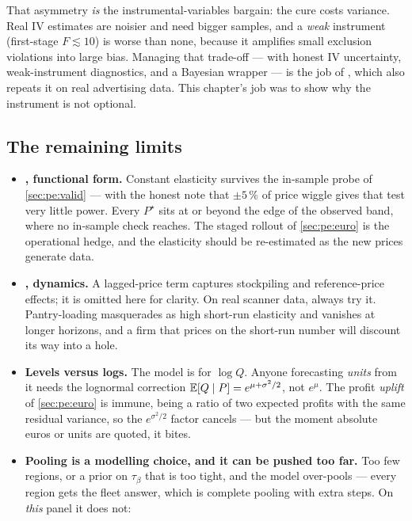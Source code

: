 That asymmetry \emph{is} the instrumental-variables bargain: the cure costs variance. Real IV
estimates are noisier and need bigger samples, and a \emph{weak} instrument (first-stage
$F \lesssim 10$) is worse than none, because it amplifies small exclusion violations into large
bias. Managing that trade-off --- with honest IV uncertainty, weak-instrument diagnostics, and a
Bayesian wrapper --- is the job of , which also repeats it on real advertising data. This
chapter's job was to show why the instrument is not optional.

\subsection*{The remaining limits}

\begin{itemize}[leftmargin=*]
  \item \textbf{, functional form.} Constant elasticity survives the in-sample
        probe of \cref{sec:pe:valid} --- with the honest note that $\pm 5\,\%$ of price wiggle gives
        that test very little power. Every $P^\star$ sits at or beyond the edge of the observed
        band, where no in-sample check reaches. The staged rollout of \cref{sec:pe:euro} is the
        operational hedge, and the elasticity should be re-estimated as the new prices generate
        data.
  \item \textbf{, dynamics.} A lagged-price term captures stockpiling and
        reference-price effects; it is omitted here for clarity. On real scanner data, always try
        it. Pantry-loading masquerades as high short-run elasticity and vanishes at longer horizons,
        and a firm that prices on the short-run number will discount its way into a hole.
  \item \textbf{Levels versus logs.} The model is for $\log Q$. Anyone forecasting \emph{units} from
        it needs the lognormal correction $\operatorname{\mathbb{E}}[Q \mid P] = e^{\mu + \sigma^{2}/2}$, not $e^{\mu}$.
        The profit \emph{uplift} of \cref{sec:pe:euro} is immune, being a ratio of two expected
        profits with the same residual variance, so the $e^{\sigma^2/2}$ factor cancels --- but the
        moment absolute euros or units are quoted, it bites.
  \item \textbf{Pooling is a modelling choice, and it can be pushed too far.} Too few regions, or a
        prior on $\tau_\beta$ that is too tight, and the model over-pools --- every region gets the
        fleet answer, which is complete pooling with extra steps. On \emph{this} panel it does not:

\end{itemize}
